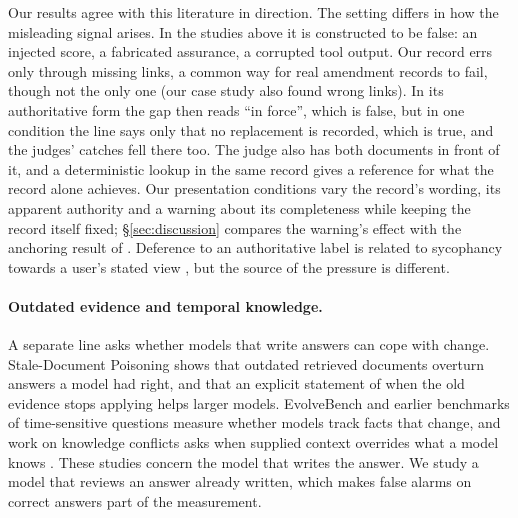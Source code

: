 Our results agree with this literature in direction. The setting differs in how the misleading signal arises. In the
studies above it is constructed to be false: an injected score, a fabricated assurance, a corrupted tool output. Our
record errs only through missing links, a common way for real amendment records to fail, though not the only one
(our case study also found wrong links). In its authoritative form the gap
then reads ``in force'', which is false, but in one condition the line says only that no replacement is recorded,
which is true, and the judges' catches fell there too. The
judge also has both documents in front of it, and a deterministic lookup in the same record gives a reference for what
the record alone achieves. Our presentation conditions vary the record's wording, its apparent authority and a
warning about its completeness while keeping the record itself fixed; \S\ref{sec:discussion} compares the warning's
effect with the anchoring result of \citet{kapetanovic2026anchoring}. Deference to an authoritative label is related
to sycophancy towards a user's stated view \citep{sharma2023sycophancy}, but the source of the pressure is different.

\paragraph{Outdated evidence and temporal knowledge.}
A separate line asks whether models that write answers can cope with change. Stale-Document Poisoning
\citep{staledoc2026} shows that outdated retrieved documents overturn answers a model had right, and that an explicit
statement of when the old evidence stops applying helps larger models. EvolveBench \citep{zhu2025evolvebench} and
earlier benchmarks of time-sensitive questions \citep{chen2021timeqa,zhang2021situatedqa,vu2024freshllms,ouyang2025hoh}
measure whether models track facts that change, and work on knowledge conflicts asks when supplied context overrides
what a model knows \citep{xie2024chameleon,xu2024knowledge,wu2024clasheval}. These studies concern the model that
writes the answer. We study a model that reviews an answer already written, which makes false alarms on correct answers
part of the measurement.


